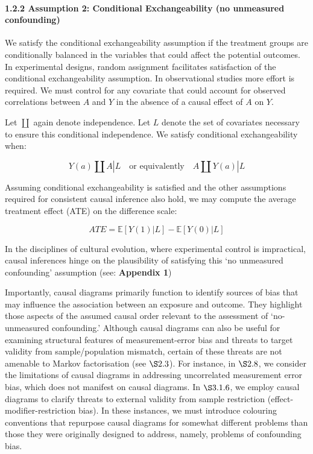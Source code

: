 \documentclass[
  singlecolumn]{article}
\let\oldparagraph\paragraph
\renewcommand{\paragraph}[1]{\oldparagraph{#1}\mbox{}}
\begin{document}
\paragraph{1.2.2 Assumption 2: Conditional Exchangeability (no
unmeasured
confounding)}\label{assumption-2-conditional-exchangeability-no-unmeasured-confounding}

We satisfy the conditional exchangeability assumption if the treatment
groups are conditionally balanced in the variables that could affect the
potential outcomes. In experimental designs, random assignment
facilitates satisfaction of the conditional exchangeability assumption.
In observational studies more effort is required. We must control for
any covariate that could account for observed correlations between \(A\)
and \(Y\) in the absence of a causal effect of \(A\) on \(Y\).

Let \(\coprod\) again denote independence. Let \(L\) denote the set of
covariates necessary to ensure this conditional independence. We satisfy
conditional exchangeability when:

\[
Y(a) \coprod A | L \quad \text{or equivalently} \quad A \coprod Y(a) | L
\]

Assuming conditional exchangeability is satisfied and the other
assumptions required for consistent causal inference also hold, we may
compute the average treatment effect (ATE) on the difference scale:

\[
ATE = \mathbb{E}[Y(1) | L] - \mathbb{E}[Y(0) | L]
\]

In the disciplines of cultural evolution, where experimental control is
impractical, causal inferences hinge on the plausibility of satisfying
this `no unmeasured confounding' assumption (see: \textbf{Appendix 1})

Importantly, causal diagrams primarily function to identify sources of
bias that may influence the association between an exposure and outcome.
They highlight those aspects of the assumed causal order relevant to the
assessment of `no-unmeasured confounding.' Although causal diagrams can
also be useful for examining structural features of measurement-error
bias and threats to target validity from sample/population mismatch,
certain of these threats are not amenable to Markov factorisation (see
\(\S 2.3\)). For instance, in \(\S 2.8\), we consider the limitations of
causal diagrams in addressing uncorrelated measurement error bias, which
does not manifest on causal diagrams. In \(\S 3.1.6\), we employ causal
diagrams to clarify threats to external validity from sample restriction
(effect-modifier-restriction bias). In these instances, we must
introduce colouring conventions that repurpose causal diagrams for
somewhat different problems than those they were originally designed to
address, namely, problems of confounding bias.
\end{document}
